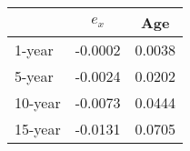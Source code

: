 \begin{tabular}{l|cc}
  \hline
 & $e_x$ & Age \\ 
  \hline
1-year & -0.0002 & 0.0038 \\ 
  5-year & -0.0024 & 0.0202 \\ 
  10-year & -0.0073 & 0.0444 \\ 
  15-year & -0.0131 & 0.0705 \\ 
   \hline
\end{tabular}
